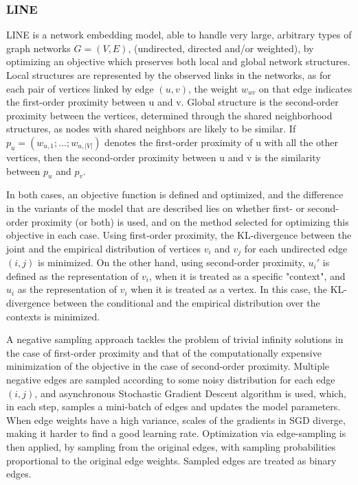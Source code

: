\subsubsection*{LINE}

LINE is a network embedding model, able to handle very large, arbitrary types of graph networks $G=(V,E)$, (undirected, directed and/or weighted), by optimizing an objective which preserves both local and global network structures. Local structures are represented by the observed links in the networks, as for each pair of vertices linked by edge $(u, v)$, the weight $w_{uv}$ on that edge indicates the first-order proximity between u and v. Global structure is the second-order proximity between the vertices, determined through the shared neighborhood structures, as nodes with shared neighbors are likely to be similar. If $p_u = (w_{u,1}; \dots ;w_{u,|V|})$ denotes the first-order proximity of u with all the other vertices, then the second-order proximity between u and v is the similarity between $p_u$ and $p_v$. 

In both cases, an objective function is defined and optimized, and the difference in the variants of the model that are described lies on whether first- or second-order proximity (or both) is used, and on the method selected for optimizing this objective in each case. Using first-order proximity, the KL-divergence between the joint and the empirical distribution of vertices $v_i$ and $v_j$ for each undirected edge $(i,j)$ is minimized. On the other hand, using second-order proximity, $u_i'$ is defined as the representation of $v_i$, when it is treated as a specific "context", and $u_i$ as the representation of $v_i$ when it is treated as a vertex. In this case, the KL-divergence between the conditional and the empirical distribution over the contexts is minimized.

A negative sampling approach tackles the problem of trivial infinity solutions in the case of first-order proximity and that of the computationally expensive minimization of the objective in the case of second-order proximity. Multiple negative edges are sampled according to some noisy distribution for each edge $(i,j)$, and asynchronous Stochastic Gradient Descent algorithm is used, which, in each step, samples a mini-batch of edges and updates the model parameters.
When edge weights have a high variance, scales of the gradients in SGD diverge, making it harder to find a good learning rate. Optimization via edge-sampling is then applied, by sampling from the original edges, with sampling probabilities proportional to the original edge weights. Sampled edges are treated as binary edges. 

